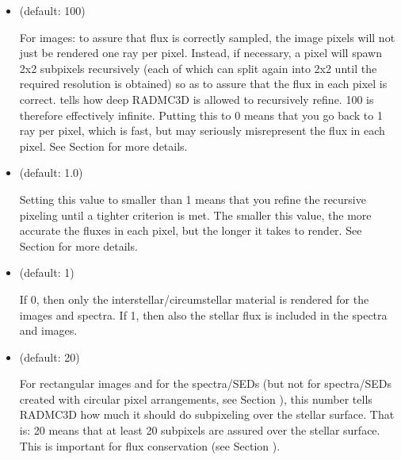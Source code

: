 \documentclass[letterpaper,10pt,english]{sphinxmanual}
\begin{document}
\begin{itemize}
\item {} 
 (default: 100)

For images: to assure that flux is correctly sampled, the image pixels
will not just be rendered one ray per pixel. Instead, if necessary,
a pixel will spawn 2x2 sub\sphinxhyphen{}pixels recursively (each of which can
split again into 2x2 until the required resolution is obtained) so
as to assure that the flux in each pixel is correct.  tells
how deep RADMC\sphinxhyphen{}3D is allowed to recursively refine. 100 is therefore
effectively infinite. Putting this to 0 means that you go back to
1 ray per pixel, which is fast, but may seriously misrepresent the flux
in each pixel. See Section {\hyperref[\detokenize{imagesspectra:sec-image-refinement}]{}} for more details.

\item {} 
 (default: 1.0) 

Setting this value to smaller than 1 means that you refine the recursive
pixeling until a tighter criterion is met. The smaller this value, the
more accurate the fluxes in each pixel, but the longer it takes to
render. See Section {\hyperref[\detokenize{imagesspectra:sec-image-refinement}]{}} for more details.

\item {} 
 (default: 1)

If 0, then only the interstellar/circumstellar material is rendered
for the images and spectra. If 1, then also the stellar flux is
included in the spectra and images.

\item {} 
 (default: 20) 

For rectangular images and for the spectra/SEDs (but not for spectra/SEDs
created with circular pixel arrangements, see Section
{\hyperref[\detokenize{imagesspectra:sec-circularimages}]{}}), this number tells RADMC\sphinxhyphen{}3D how
much it should do sub\sphinxhyphen{}pixeling over the stellar surface. That is: 20 means
that at least 20 sub\sphinxhyphen{}pixels are assured over the stellar surface. This is
important for flux conservation (see Section {\hyperref[\detokenize{imagesspectra:sec-image-refinement}]{}}).


\end{itemize}
\end{document}
